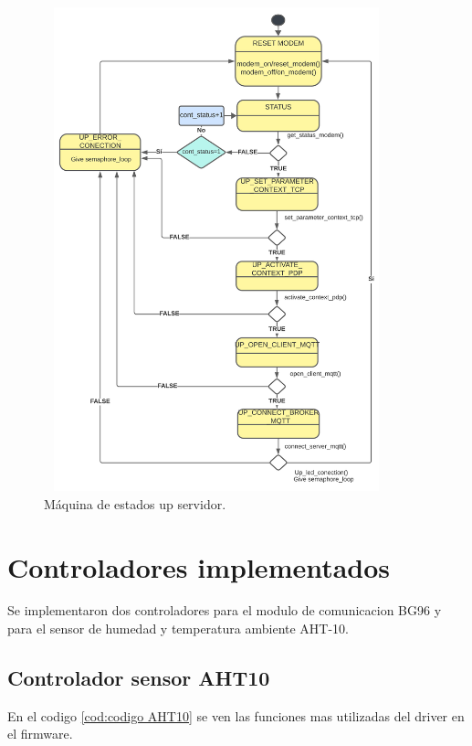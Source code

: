 \begin{figure}[t!]
  \centering
	\includegraphics[width=10cm, height=14cm]{./Figures/SM up server.png}
	\caption{Máquina de estados up servidor.}
	\label{fig:Maquina de estados up servidor}
\end{figure}

\section{Controladores implementados}
Se implementaron dos controladores para el modulo de comunicacion BG96 y para el sensor de humedad y temperatura ambiente AHT-10.

\subsection{Controlador sensor AHT10} 
En el codigo \ref{cod:codigo AHT10} se ven las funciones mas utilizadas del driver en el firmware.

